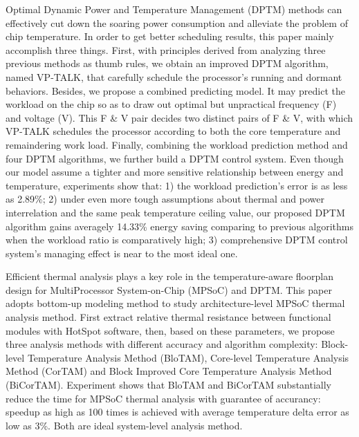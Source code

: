 
\begin{eabstract}

   Optimal Dynamic Power and Temperature Management (DPTM) methods can effectively cut down the soaring power consumption and alleviate the problem of chip temperature. In order to get better scheduling results, this paper mainly accomplish three things. First, with principles derived from analyzing three previous methods as thumb rules, we obtain an improved DPTM algorithm, named VP-TALK, that carefully schedule the processor's running and dormant behaviors. Besides, we propose a combined predicting model. It may predict the workload on the chip so as to draw out optimal but unpractical frequency (F) and voltage (V). This F \& V pair decides two distinct pairs of F \& V, with which VP-TALK schedules the processor according to both the core temperature and remaindering work load. Finally, combining the workload prediction method and four DPTM algorithms, we further build a DPTM control system. Even though our model assume a tighter and more sensitive relationship between energy and temperature, experiments show that: 1) the workload prediction's error is as less as 2.89\%; 2) under even more tough assumptions about thermal and power interrelation and the same peak temperature ceiling value, our proposed DPTM algorithm gains averagely 14.33\% energy saving comparing to previous algorithms when the workload ratio is comparatively high; 3) comprehensive DPTM control system's managing effect is near to the most ideal one.


   Efficient thermal analysis plays a key role in the temperature-aware floorplan design for MultiProcessor System-on-Chip (MPSoC) and DPTM. This paper adopts bottom-up modeling method to study architecture-level MPSoC thermal analysis method. First extract relative thermal resistance between functional modules with HotSpot software, then, based on these parameters, we propose three analysis methods with different accuracy and algorithm complexity: Block-level Temperature Analysis Method (BloTAM), Core-level Temperature Analysis Method (CorTAM) and Block Improved Core Temperature Analysis Method (BiCorTAM). Experiment shows that BloTAM and BiCorTAM substantially reduce the time for MPSoC thermal analysis with guarantee of accurancy: speedup as high as 100 times is achieved with average temperature delta error as low as 3\%. Both are ideal system-level analysis method.

\end{eabstract}


